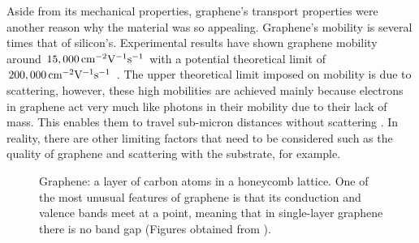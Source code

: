\noindent Aside from its mechanical properties, graphene's transport properties were another reason why the material was so appealing. Graphene's mobility is several times that of silicon's. Experimental results have shown graphene mobility around $15,000\,\mathrm{cm}^{-2}\mathrm{V}^{-1}\mathrm{s}^{-1}$ with a potential theoretical limit of $200,000\,\mathrm{cm}^{-2}\mathrm{V}^{-1}\mathrm{s}^{-1}$ \cite{Dargys_Encylco1994,Akinwande_NatureComm2014}. The upper theoretical limit imposed on mobility is due to scattering, however, these high mobilities are achieved mainly because electrons in graphene act very much like photons in their mobility due to their lack of mass. This enables them to travel sub-micron distances without scattering \cite{Novoselov_NatureMat2007}. In reality, there are other limiting factors that need to be considered such as the quality of graphene and scattering with the substrate, for example. 
\begin{figure}[ht]
	\centering
	\qquad
	\caption[Lattice and band structure of graphene]{\protect{} Graphene: a layer of carbon atoms in a honeycomb lattice. \protect{} One of the most unusual features of graphene is that its conduction and valence bands meet at a point, meaning that in single-layer graphene there is no band gap (Figures obtained from \cite{Berkley_Online2009}).}
	\label{fig:graphene_structures}
\end{figure}

